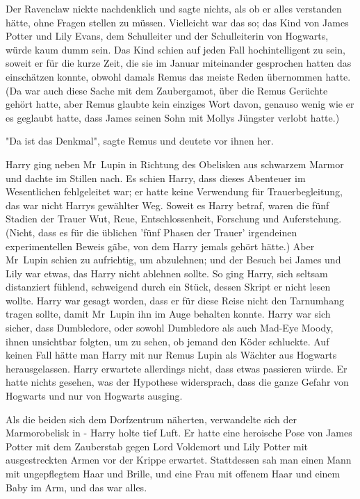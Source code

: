 {Der Ravenclaw nickte nachdenklich und sagte nichts, als ob er alles verstanden hätte, ohne Fragen stellen zu müssen. Vielleicht war das so; das Kind von James Potter und Lily Evans, dem Schulleiter und der Schulleiterin von Hogwarts, würde kaum dumm sein. Das Kind schien auf jeden Fall hochintelligent zu sein, soweit er für die kurze Zeit, die sie im Januar miteinander gesprochen hatten das einschätzen konnte, obwohl damals Remus das meiste Reden übernommen hatte. (Da war auch diese Sache mit dem Zaubergamot, über die Remus Gerüchte gehört hatte, aber Remus glaubte kein einziges Wort davon, genauso wenig wie er es geglaubt hatte, dass James seinen Sohn mit Mollys Jüngster verlobt hatte.)

"Da ist das Denkmal", sagte Remus und deutete vor ihnen her.

Harry ging neben Mr~Lupin in Richtung des Obelisken aus schwarzem Marmor und dachte im Stillen nach. Es schien Harry, dass dieses Abenteuer im Wesentlichen fehlgeleitet war; er hatte keine Verwendung für Trauerbegleitung, das war nicht Harrys gewählter Weg. Soweit es Harry betraf, waren die fünf Stadien der Trauer Wut, Reue, Entschlossenheit, Forschung und Auferstehung. (Nicht, dass es für die üblichen 'fünf Phasen der Trauer' irgendeinen experimentellen Beweis gäbe, von dem Harry jemals gehört hätte.) Aber Mr~Lupin schien zu aufrichtig, um abzulehnen; und der Besuch bei James und Lily war etwas, das Harry nicht ablehnen sollte. So ging Harry, sich seltsam distanziert fühlend, schweigend durch ein Stück, dessen Skript er nicht lesen wollte. Harry war gesagt worden, dass er für diese Reise nicht den Tarnumhang tragen sollte, damit Mr~Lupin ihn im Auge behalten konnte. Harry war sich sicher, dass Dumbledore, oder sowohl Dumbledore als auch Mad-Eye Moody, ihnen unsichtbar folgten, um zu sehen, ob jemand den Köder schluckte. Auf keinen Fall hätte man Harry mit nur Remus Lupin als Wächter aus Hogwarts herausgelassen. Harry erwartete allerdings nicht, dass etwas passieren würde. Er hatte nichts gesehen, was der Hypothese widersprach, dass die ganze Gefahr von Hogwarts und nur von Hogwarts ausging.

Als die beiden sich dem Dorfzentrum näherten, verwandelte sich der Marmorobelisk in - Harry holte tief Luft. Er hatte eine heroische Pose von James Potter mit dem Zauberstab gegen Lord Voldemort und Lily Potter mit ausgestreckten Armen vor der Krippe erwartet. Stattdessen sah man einen Mann mit ungepflegtem Haar und Brille, und eine Frau mit offenem Haar und einem Baby im Arm, und das war alles.

}
